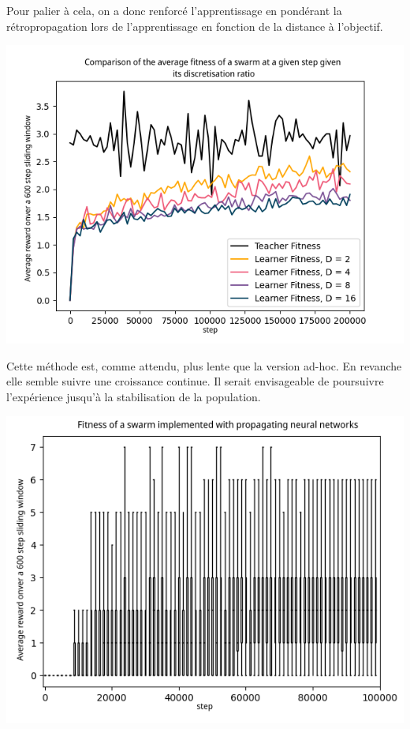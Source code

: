 \documentclass[a4paper, 12pt]{report}
\begin{document}
	Pour palier à cela, on a donc renforcé l'apprentissage en pondérant la rétropropagation lors de l'apprentissage en fonction de la distance à l'objectif.

\begin{center}
	\includegraphics{averageComparisons}
\end{center}	
	
Cette méthode est, comme attendu, plus lente que la version ad-hoc. En revanche elle semble suivre une croissance continue. Il serait envisageable de poursuivre l'expérience jusqu'à la stabilisation de la population.
	
\begin{center}
	\includegraphics{learner_boxplot}
\end{center}	
\end{document}
